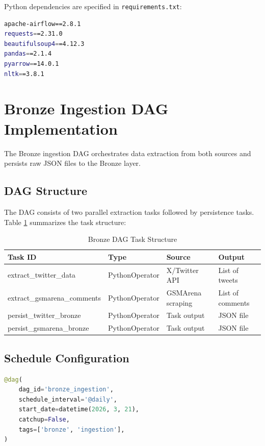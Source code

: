 \documentclass[11pt,a4paper]{article}
\begin{document}
Python dependencies are specified in \texttt{requirements.txt}:

\begin{lstlisting}[language=bash, caption={requirements.txt}, basicstyle=\ttfamily\footnotesize]
apache-airflow==2.8.1
requests==2.31.0
beautifulsoup4==4.12.3
pandas==2.1.4
pyarrow==14.0.1
nltk==3.8.1
\end{lstlisting}

\section{Bronze Ingestion DAG Implementation}

The Bronze ingestion DAG orchestrates data extraction from both sources and persists raw JSON files to the Bronze layer.

\subsection{DAG Structure}

The DAG consists of two parallel extraction tasks followed by persistence tasks. Table \ref{tab:dag-tasks} summarizes the task structure:

\begin{table}[H]
\centering
\begin{tabular}{>{\ttfamily}l l l l}
\toprule
\textbf{Task ID} & \textbf{Type} & \textbf{Source} & \textbf{Output} \\
\midrule
extract\_twitter\_data & PythonOperator & X/Twitter API & List of tweets \\
extract\_gsmarena\_comments & PythonOperator & GSMArena scraping & List of comments \\
persist\_twitter\_bronze & PythonOperator & Task output & JSON file \\
persist\_gsmarena\_bronze & PythonOperator & Task output & JSON file \\
\bottomrule
\end{tabular}
\caption{Bronze DAG Task Structure}
\label{tab:dag-tasks}
\end{table}

\subsection{Schedule Configuration}

\begin{lstlisting}[language=Python, caption={DAG Schedule Configuration}, basicstyle=\ttfamily\footnotesize]
@dag(
    dag_id='bronze_ingestion',
    schedule_interval='@daily',
    start_date=datetime(2026, 3, 21),
    catchup=False,
    tags=['bronze', 'ingestion'],
)
\end{lstlisting}
\end{document}
